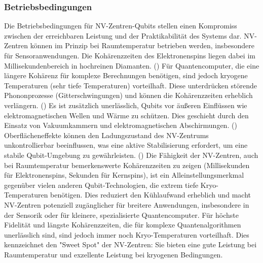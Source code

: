 \subsubsection{Betriebsbedingungen}
Die Betriebsbedingungen für NV-Zentren-Qubits stellen einen Kompromiss zwischen der erreichbaren Leistung und der Praktikabilität des Systems dar.
NV-Zentren können im Prinzip bei Raumtemperatur betrieben werden, insbesondere für Sensoranwendungen. Die Kohärenzzeiten des Elektronenspins liegen dabei im Millisekundenbereich in hochreinen Diamanten. (\cite{gmbhCCGFachartikelQuantencomputer2025}) Für Quantencomputer, die eine längere Kohärenz für komplexe Berechnungen benötigen, sind jedoch kryogene Temperaturen (sehr tiefe Temperaturen) vorteilhaft. Diese unterdrücken störende Phononprozesse (Gitterschwingungen) und können die Kohärenzzeiten erheblich verlängern. (\cite{childressDiamondNVCenters2013a})
Es ist zusätzlich unerlässlich, Qubits vor äußeren Einflüssen wie elektromagnetischen Wellen und Wärme zu schützen. Dies geschieht durch den Einsatz von Vakuumkammern und elektromagnetischen Abschirmungen. (\cite{gmbhCCGFachartikelQuantencomputer2025}) Oberflächeneffekte können den Ladungszustand des NV-Zentrums unkontrollierbar beeinflussen, was eine aktive Stabilisierung erfordert, um eine stabile Qubit-Umgebung zu gewährleisten. (\cite{schreyvogelDynamischeManipulationNVZentren2017})
Die Fähigkeit der NV-Zentren, auch bei Raumtemperatur bemerkenswerte Kohärenzzeiten zu zeigen (Millisekunden für Elektronenspins, Sekunden für Kernspins), ist ein Alleinstellungsmerkmal gegenüber vielen anderen Qubit-Technologien, die extrem tiefe Kryo-Temperaturen benötigen. Dies reduziert den Kühlaufwand erheblich und macht NV-Zentren potenziell zugänglicher für breitere Anwendungen, insbesondere in der Sensorik oder für kleinere, spezialisierte Quantencomputer. Für höchste Fidelität und längste Kohärenzzeiten, die für komplexe Quantenalgorithmen unerlässlich sind, sind jedoch immer noch Kryo-Temperaturen vorteilhaft. Dies kennzeichnet den "Sweet Spot" der NV-Zentren: Sie bieten eine gute Leistung bei Raumtemperatur und exzellente Leistung bei kryogenen Bedingungen.

